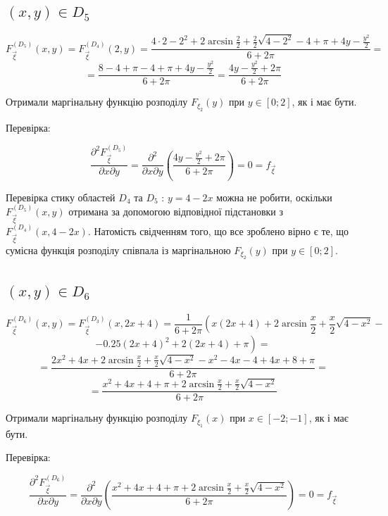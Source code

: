 \documentclass[14pt, a4paper, ukrainian]{extreport}
\begin{document}
	\subsection{$(x, y) \in D_5$}
	
	$$ F_{\vec \xi}^{\left(D_5\right)}(x, y) = F_{\vec \xi}^{\left(D_4\right)}(2, y) = \frac{4\cdot2 - 2^2 + 2\arcsin\frac{2}{2} + \frac{2}{2}\sqrt{4-2^2} - 4 + \pi + 4y - \frac{y^2}{2}}{6+2\pi} = 
	$$
	$$ = \frac{8 - 4 + \pi - 4 + \pi + 4y - \frac{y^2}{2}}{6+2\pi} = \frac{4y - \frac{y^2}{2} + 2\pi }{6 + 2\pi}
	$$
	
	Отримали маргінальну функцію розподілу $ F_{\xi_2} (y) $ при $y \in [0; 2]$, як і має бути.
	
	Перевірка:
	
	$$\frac{\partial^2F_{\vec\xi}^{\left(D_5\right)}}{\partial x \partial y} = \frac{\partial^2}{\partial x \partial y}\left(\frac{4y - \frac{y^2}{2} + 2\pi }{6 + 2\pi}\right) = 0 = f_{\vec\xi}
	$$
	
	Перевірка стику областей $D_4$ та $D_5$ : $ y = 4 - 2x$ можна не робити, оскільки $F_{\vec \xi}^{\left(D_5\right)}(x, y)$ отримана за допомогою відповідної підстановки з \\
	$F_{\vec \xi}^{\left(D_4\right)}(x, 4 - 2x)$. Натомість свідченням того, що все зроблено вірно є те, що сумісна функція розподілу співпала із маргінальною $ F_{\xi_2} (y) $ при $y \in [0; 2]$.
	
	\subsection{$(x, y) \in D_6$}
	
	$$ F_{\vec \xi}^{\left(D_6\right)}(x, y) = F_{\vec \xi}^{\left(D_3\right)}(x, 2x + 4) = \frac{1}{6+2\pi}\left(x(2x+4) + 2\arcsin\frac{x}{2} + \frac{x}{2}\sqrt{4-x^2} - \right.
	$$
	$$ \left.- 0.25(2x+4)^2 + 2(2x+4) + \pi \right) = 
	$$
	$$ = \frac{2x^2 +4x + 2\arcsin\frac{x}{2} + \frac{x}{2}\sqrt{4-x^2} - x^2 - 4x -4 + 4x +8 + \pi}{6+2\pi} = 
	$$
	$$ = \frac{x^2 +4x +4 +\pi + 2\arcsin\frac{x}{2} + \frac{x}{2}\sqrt{4-x^2}}{6+2\pi} 
	$$
	
	Отримали маргінальну функцію розподілу $ F_{\xi_1} (x) $ при $x \in [-2; -1]$, як і має бути.
	
	Перевірка:
	
	$$\frac{\partial^2F_{\vec\xi}^{\left(D_6\right)}}{\partial x \partial y} = \frac{\partial^2}{\partial x \partial y} \left(\frac{x^2 +4x +4 +\pi + 2\arcsin\frac{x}{2} + \frac{x}{2}\sqrt{4-x^2}}{6+2\pi} \right) = 0 = f_{\vec\xi}
	$$
	
\end{document}
